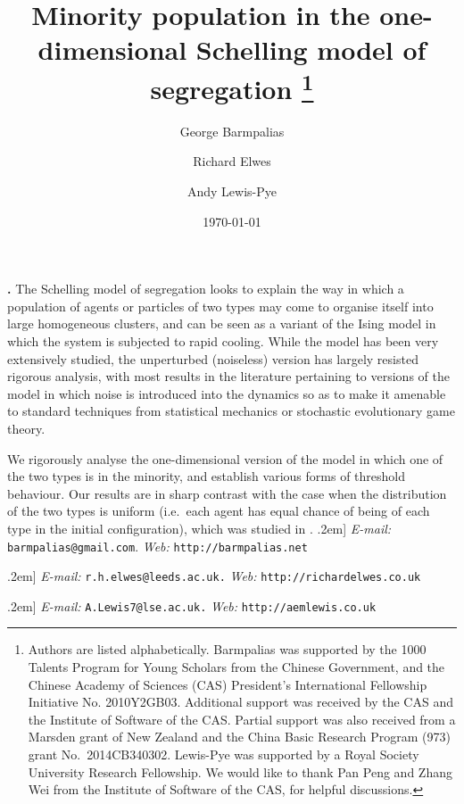 \documentclass[11pt]{article}
\title{Minority
population in the one-dimensional 
Schelling  model of segregation
\thanks{Authors are listed alphabetically. 
Barmpalias was supported by the 
1000 Talents Program for Young Scholars from the Chinese Government,
and the Chinese Academy of Sciences (CAS) President's International 
Fellowship Initiative No. 2010Y2GB03.
Additional support was received by
the CAS and the Institute of Software of the CAS.
Partial support was also received from a Marsden grant of New Zealand 
and the China Basic Research Program (973) grant No.~2014CB340302.
Lewis-Pye was supported by a Royal Society University 
Research Fellowship. We would like to thank Pan Peng and Zhang Wei 
from the Institute of Software of the CAS, for helpful discussions.}}
\author{George Barmpalias  \and Richard Elwes \and	Andy Lewis-Pye}
\date{\today}
\theoremstyle{plain}
\numberwithin{equation}{subsection}
\renewenvironment{abstract}
 { \normalsize
  \list{}{
    \setlength{\leftmargin}{.0cm}\setlength{\rightmargin}{\leftmargin}}\item {\bf \abstractname.} \relax}
 {\endlist}
\begin{document}
\maketitle


\begin{abstract}
The Schelling model of segregation looks to explain the way in which a population of agents or particles of two types may come to organise itself into large homogeneous clusters, and can be seen as a variant of the Ising model in which the system is subjected to rapid cooling.  
While the model has been very extensively studied, the unperturbed (noiseless) version has largely resisted rigorous analysis, with most results in the literature pertaining to versions of the model in which noise is introduced into the dynamics so as to make it amenable to standard techniques from statistical mechanics or stochastic evolutionary game theory. 

We rigorously analyse the one-dimensional version of the model in 
which one of the two types is in the minority, and establish various forms of threshold behaviour. 
 Our  results are in sharp contrast with the case when the distribution of the two types
is uniform (i.e.\ each agent has equal chance of being of each type in the initial configuration), which was studied in
\cite{brandt:an, BELschel13}. 
\end{abstract}
\vspace*{\fill}
\0.2em] 
\textit{E-mail:} \texttt{\textcolor{dnrgr}{barmpalias@gmail.com}}.
\textit{Web:} \texttt{\textcolor{dnrre}{http://barmpalias.net}}\par
\addvspace{\medskipamount}
\0.2em]
\textit{E-mail:} \texttt{\textcolor{dnrgr}{r.h.elwes@leeds.ac.uk.}}
\textit{Web:} \texttt{\textcolor{dnrre}{http://richardelwes.co.uk}}\par
\addvspace{\medskipamount}
\0.2em]
\textit{E-mail:} \texttt{\textcolor{dnrgr}{A.Lewis7@lse.ac.uk.}}
\textit{Web:} \texttt{\textcolor{dnrre}{http://aemlewis.co.uk}} 
\vfill \thispagestyle{empty}
\clearpage
\end{document}
